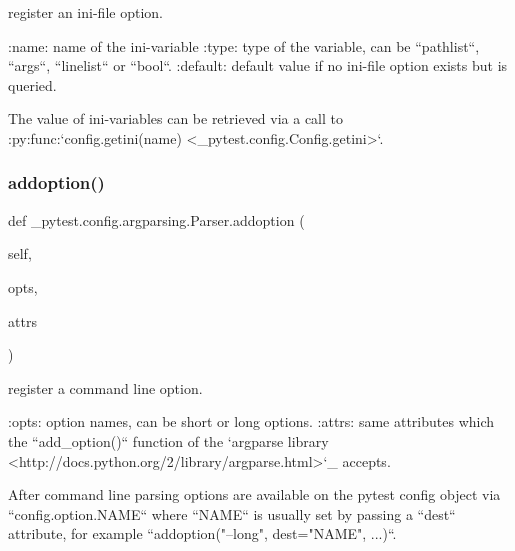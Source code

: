 \begin{DoxyVerb}register an ini-file option.

:name: name of the ini-variable
:type: type of the variable, can be ``pathlist``, ``args``, ``linelist``
       or ``bool``.
:default: default value if no ini-file option exists but is queried.

The value of ini-variables can be retrieved via a call to
:py:func:`config.getini(name) <_pytest.config.Config.getini>`.
\end{DoxyVerb}
 \mbox{\label{class__pytest_1_1config_1_1argparsing_1_1_parser_a8b9a087d79364eb84f17bd2bd5098c96}} 
\subsubsection{\texorpdfstring{addoption()}{addoption()}}
{\footnotesize\ttfamily def \+\_\+pytest.\+config.\+argparsing.\+Parser.\+addoption (\begin{DoxyParamCaption}\item[{}]{self,  }\item[{}]{opts,  }\item[{}]{attrs }\end{DoxyParamCaption})}

\begin{DoxyVerb}register a command line option.

:opts: option names, can be short or long options.
:attrs: same attributes which the ``add_option()`` function of the
   `argparse library
   <http://docs.python.org/2/library/argparse.html>`_
   accepts.

After command line parsing options are available on the pytest config
object via ``config.option.NAME`` where ``NAME`` is usually set
by passing a ``dest`` attribute, for example
``addoption("--long", dest="NAME", ...)``.
\end{DoxyVerb}
 \mbox{\label{class__pytest_1_1config_1_1argparsing_1_1_parser_ad886d8d67ef88b3fb6b730a1d3a89499}} 
